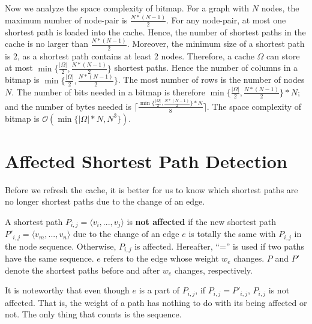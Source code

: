 Now we analyze the space complexity of bitmap. For a graph with $N$ nodes, the maximum number of node-pair is $\frac{N*(N-1)}{2}$.
For any node-pair, at most one shortest path is loaded into the cache. Hence, the number of shortest paths in the cache is no larger than $\frac{N*(N-1)}{2}$. Moreover, the minimum size of a shortest path is 2, as a shortest path contains at least 2 nodes.
Therefore, a cache $\Omega$ can store at most $\min\{{\frac{|\Omega|}{2},\frac{N*(N-1)}{2}}\}$ shortest paths. Hence the number of columns in a bitmap is $\min\{{\frac{|\Omega|}{2},\frac{N*(N-1)}{2}}\}$. The most number of rows is the number of nodes $N$.
The number of bits needed in a bitmap is therefore $\min\{{\frac{|\Omega|}{2},\frac{N*(N-1)}{2}}\}*N$; and the number of bytes needed is $\lceil\frac{\min\{{\frac{|\Omega|}{2},\frac{N*(N-1)}{2}}\}*N}{8}\rceil$.
The space complexity of bitmap is $\mathcal O(\min\{{|\Omega|*N,N^3\}})$.


\section{Affected Shortest Path Detection}
\label{sec:detect-affected}
Before we refresh the cache, it is better for us to know which shortest paths are no longer shortest paths due to the change of an edge.

A shortest path $P_{i,j}=\langle v_i,...,v_j\rangle$ is \textbf{not affected} if the new shortest path $P'_{i,j}=\langle v_m,...,v_n\rangle$ due to the change of an edge $e$ is totally the same with $P_{i,j}$ in the node sequence.
Otherwise, $P_{i,j}$ is affected.
Hereafter, ``='' is used if two paths have the same sequence.
$e$ refers to the edge whose weight $w_e$ changes.
$P$ and $P'$ denote the shortest paths before and after $w_e$ changes, respectively.

It is noteworthy that even though $e$ is a part of $P_{i,j}$, if $P_{i,j}=P'_{i,j}$, $P_{i,j}$ is not affected. That is, the weight of a path has nothing to do with its being affected or not. The only thing that counts is the sequence.

